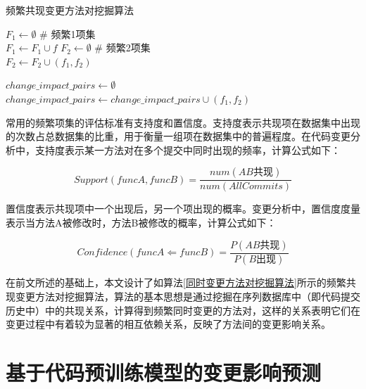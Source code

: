 \begin{algorithm}[h]
    \caption{频繁共现变更方法对挖掘算法}
    \label{同时变更方法对挖掘算法}
     $F_1 \gets \emptyset$  \# 频繁1项集\\  
     {
         {
            $F_1 \gets F_1 \cup f$
        }
    } 
    $F_2 \gets \emptyset$  \# 频繁2项集\\ 
     {
         {
            $F_2 \gets F_2 \cup (f_1, f_2)$
        }
    }
    
    $change\_impact\_pairs \gets \emptyset$ \\ 
     {
         {
            $change\_impact\_pairs \gets change\_impact\_pairs \cup (f_1, f_2)$
        }
    }
    \end{algorithm}


常用的频繁项集的评估标准有支持度和置信度。支持度表示共现项在数据集中出现的次数占总数据集的比重，用于衡量一组项在数据集中的普遍程度。在代码变更分析中，支持度表示某一方法对在多个提交中同时出现的频率，计算公式如下：

\begin{equation}
\label{1_Support}
Support(funcA,funcB)=\frac{num(AB\text{共现})}{num(AllCommits)}
\end{equation}

置信度表示共现项中一个出现后，另一个项出现的概率。变更分析中，置信度度量表示当方法A被修改时，方法B被修改的概率，计算公式如下：

\begin{equation}
\label{1_Confidence}
Confidence(funcA\Leftarrow funcB)=\frac{P(AB\text{共现})}{P(B\text{出现})}
\end{equation}

在前文所述的基础上，本文设计了如算法\ref{同时变更方法对挖掘算法}所示的频繁共现变更方法对挖掘算法，算法的基本思想是通过挖掘在序列数据库中（即代码提交历史中）中的共现关系，计算得到频繁同时变更的方法对，这样的关系表明它们在变更过程中有着较为显著的相互依赖关系，反映了方法间的变更影响关系。

\section{基于代码预训练模型的变更影响预测}
